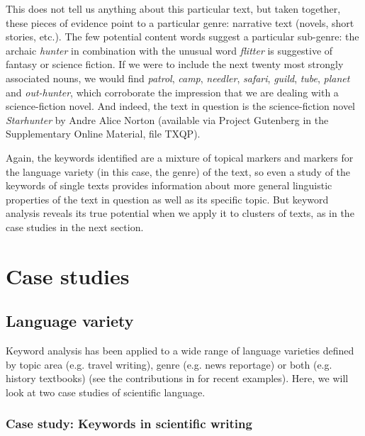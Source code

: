 This does not tell us anything about this particular text, but taken together, these pieces of evidence point to a particular genre:  narrative text (novels,  short stories, etc.). The few potential content words suggest a particular sub\hyp{}genre: the archaic \textit{hunter} in combination with the unusual word \textit{flitter} is suggestive of fantasy or science fiction. If we were to include the next twenty most strongly associated  nouns,  we would find \textit{patrol}, \textit{camp}, \textit{needler}, \textit{safari}, \textit{guild}, \textit{tube}, \textit{planet} and \textit{out\hyp{}hunter}, which corroborate the impression that we are dealing with a science\hyp{}fiction  novel. And indeed, the text in question is the science\hyp{}fiction novel \textit{Starhunter} by Andre Alice Norton (available via Project Gutenberg in the Supplementary Online Material, file TXQP).

Again, the keywords  identified are a mixture of topical markers and markers for the language variety  (in this case, the genre)  of the text, so even a study of the keywords of single texts provides information about more general linguistic properties of the text in question as well as its specific topic. But keyword  analysis reveals its true potential when we apply it to clusters of texts, as in the case studies in the next section.

\section{Case studies}\label{sec:keywordcasestudies}
\subsection{Language variety}\label{sec:texttype}

Keyword  analysis has been applied to a wide range of language varieties  defined by topic area (e.g. travel writing), genre  (e.g. news reportage)  or both (e.g. history textbooks) (see the contributions in \citealt{bondi_keyness_2010} for recent examples). Here, we will look at two case studies of scientific language.

\subsubsection{Case study: Keywords in scientific writing}
\label{sec:keywordsinscientificwriting}

